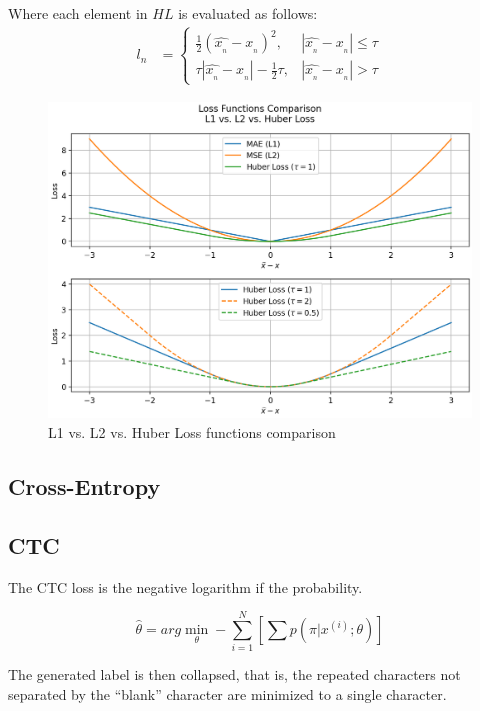 Where each element in \(HL\) is evaluated as follows:
\begin{align}
    l_{n} & = \begin{cases}
        \frac{1}{2}\left( \widehat{x_{_{n}}} - x_{_{n}} \right)^{2}, & |\widehat{x_{_{n}}} - x_{_{n}}| \leq \tau  \\
        \tau |\widehat{x_{_{n}}} - x_{_{n}}|-\frac{1}{2}\tau, & |\widehat{x_{_{n}}} - x_{_{n}}| > \tau
    \end{cases}
\end{align}
%
\begin{figure}[H]
    \centering
    \includegraphics[width=0.95\linewidth]{ANN/images/l1l2huber_comparison}
    \caption{L1 vs. L2 vs. Huber Loss functions comparison}\label{fig:l1l2huber_comparison}
\end{figure}



\subsection{Cross-Entropy}
\subsection{CTC}
The CTC loss is the negative logarithm if the probability.

\begin{equation}
    \hat{\theta} = arg \min_{\theta} - \sum_{i=1}^{N} \left[ \sum p\left( \pi | x^{(i)}; \theta \right) \right]
\end{equation}

The generated label is then collapsed, that is, the repeated characters not 
separated by the ``blank'' character are minimized to a single character.

